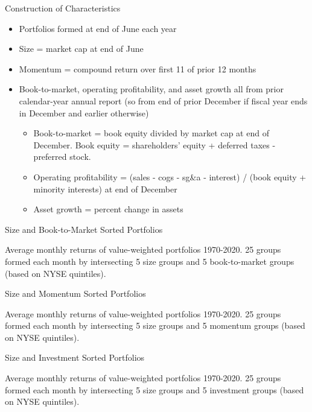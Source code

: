 \documentclass[10pt]{beamer}
\newcommand{\bi}{\begin{itemize}}
\newcommand{\ei}{\end{itemize}}
\newcommand{\im}{\item}
\begin{document}
\begin{frame}{Construction of Characteristics}
\bi 
\im Portfolios formed at end of June each year

\im Size = market cap at end of June

\im Momentum = compound return over first 11 of prior 12 months

\im Book-to-market, operating profitability, and asset growth all from prior calendar-year annual report (so from end of prior December if fiscal year ends in December and earlier otherwise)
\bi
\im 

Book-to-market = book equity divided by market cap at end of December.  Book equity = shareholders' equity + deferred taxes - preferred stock.

\im Operating profitability = (sales - cogs - sg\&a - interest) / (book equity + minority interests) at end of December

\im Asset growth = percent change in assets
\ei
\ei 
\end{frame}


\begin{frame}{Size and Book-to-Market Sorted Portfolios}

Average monthly returns of value-weighted portfolios 1970-2020.  25 groups formed each month by intersecting 5 size groups and 5 book-to-market groups (based on NYSE quintiles).

\begin{center}

\end{center}
\end{frame}

\begin{frame}{Size and Momentum Sorted Portfolios}

Average monthly returns of value-weighted portfolios 1970-2020.  25 groups formed each month by intersecting 5 size groups and 5 momentum groups (based on NYSE quintiles).

\begin{center}

\end{center}
\end{frame}

\begin{frame}{Size and Investment Sorted Portfolios}

Average monthly returns of value-weighted portfolios 1970-2020.  25 groups formed each month by intersecting 5 size groups and 5 investment groups (based on NYSE quintiles).

\begin{center}

\end{center}
\end{frame}
\end{document}
